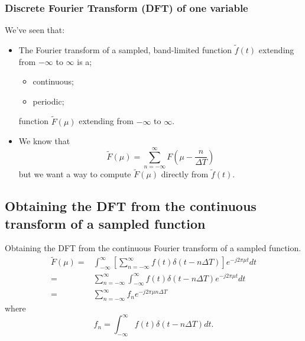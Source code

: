 \begin{frame}
\frametitle{Discrete Fourier Transform (DFT) of one variable}
We've seen that:
\begin{itemize}
\item The Fourier transform of a sampled, band-limited function $\tilde{f}(t)$ extending from $-\infty$ to $\infty$ is a;
\begin{itemize}
\item continuous;
\item periodic;
\end{itemize}
function $\tilde{F}(\mu)$ extending from $-\infty$ to $\infty$.
\item We know that
\[
\tilde{F}(\mu) = \sum_{n=-\infty}^{\infty} F\left ( \mu - \dfrac{n}{\Delta T} \right )
\]
but we want a way to compute $\tilde{F}(\mu)$ directly from $\tilde{f}(t)$.
\end{itemize}
\end{frame}


\subsection{Obtaining the DFT from the continuous transform of a sampled function}


\begin{frame}
Obtaining the DFT from the continuous Fourier transform of a sampled function.
\begin{equation}
\begin{split}
\tilde{F}(\mu) %
= & \int_{-\infty}^{\infty} \left [ \sum_{n=-\infty}^{\infty} f(t)\delta(t-n\Delta T) \right ] e^{-j2\pi \mu t}dt \\
= & \sum_{n=-\infty}^{\infty} \int_{-\infty}^{\infty} f(t) \delta(t-n\Delta T) e^{-j2\pi \mu t}dt \\
= & \sum_{n=-\infty}^{\infty} f_{n} e^{-j2\pi \mu n\Delta T}
\end{split}
\end{equation}
where
\begin{equation}
f_{n} = \int_{-\infty}^{\infty} f(t) \delta(t - n\Delta T) dt.
\end{equation}
\end{frame}

